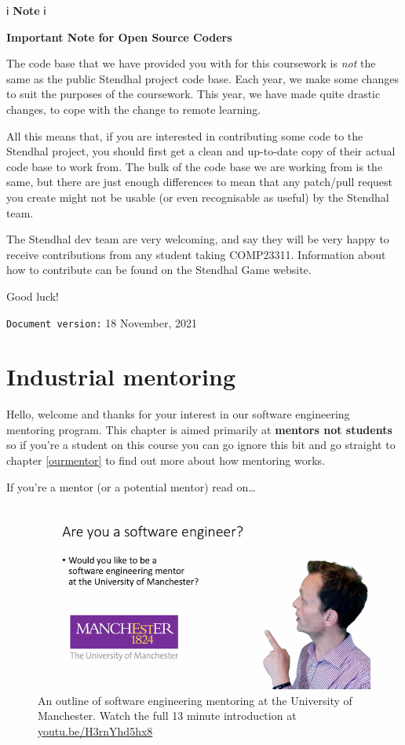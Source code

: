 \documentclass[
]{book}
\begin{document}
ℹ️ \textbf{Note} ℹ️

\textbf{Important Note for Open Source Coders}

The code base that we have provided you with for this coursework is \emph{not} the same as the public Stendhal project code base. Each year, we make some changes to suit the purposes of the coursework. This year, we have made quite drastic changes, to cope with the change to remote learning.

All this means that, if you are interested in contributing some code to the Stendhal project, you should first get a clean and up-to-date copy of their actual code base to work from. The bulk of the code base we are working from is the same, but there are just enough differences to mean that any patch/pull request you create might not be usable (or even recognisable as useful) by the Stendhal team.

The Stendhal dev team are very welcoming, and say they will be very happy to receive contributions from any student taking COMP23311. Information about how to contribute can be found on the Stendhal Game website.

Good luck!

\texttt{Document\ version:} 18 November, 2021

\hypertarget{mentoring}{%
\chapter{Industrial mentoring}\label{mentoring}}

Hello, welcome and thanks for your interest in our software engineering mentoring program. This chapter is aimed primarily at \textbf{mentors not students} so if you're a student on this course you can go ignore this bit and go straight to chapter \ref{ourmentor} to find out more about how mentoring works.

If you're a mentor (or a potential mentor) read on\ldots{}

\begin{figure}

{\centering \includegraphics[width=1\linewidth]{images/software-mentoring} 

}

\caption{An outline of software engineering mentoring at the University of Manchester. Watch the full 13 minute introduction at \href{https://youtu.be/H3rnYhd5hx8}{youtu.be/H3rnYhd5hx8}}\label{fig:mentoring-fig}
\end{figure}
\end{document}
